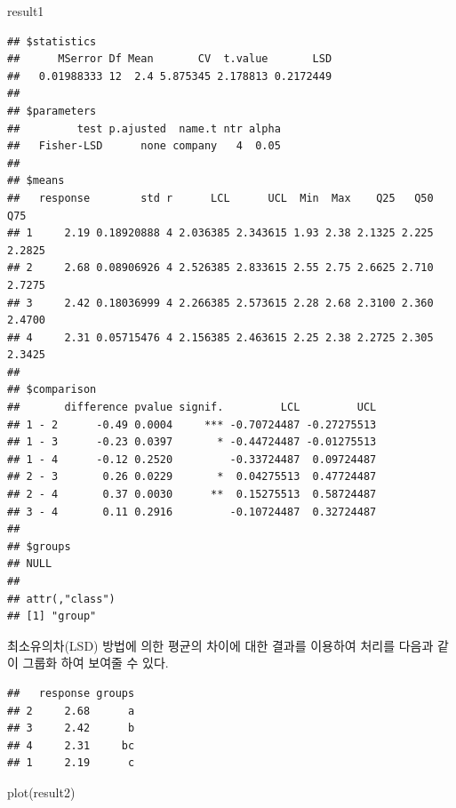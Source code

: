 \documentclass[
]{book}
\newenvironment{Shaded}{\begin{snugshade}}{\end{snugshade}}
\newcommand{\AttributeTok}[1]{\textcolor[rgb]{0.77,0.63,0.00}{#1}}
\newcommand{\ConstantTok}[1]{\textcolor[rgb]{0.00,0.00,0.00}{#1}}
\newcommand{\FunctionTok}[1]{\textcolor[rgb]{0.00,0.00,0.00}{#1}}
\newcommand{\NormalTok}[1]{#1}
\newcommand{\OtherTok}[1]{\textcolor[rgb]{0.56,0.35,0.01}{#1}}
\newcommand{\SpecialCharTok}[1]{\textcolor[rgb]{0.00,0.00,0.00}{#1}}
\newcommand{\StringTok}[1]{\textcolor[rgb]{0.31,0.60,0.02}{#1}}
\begin{document}
\begin{Shaded}
\begin{Highlighting}[]
\NormalTok{result1}
\end{Highlighting}
\end{Shaded}

\begin{verbatim}
## $statistics
##      MSerror Df Mean       CV  t.value       LSD
##   0.01988333 12  2.4 5.875345 2.178813 0.2172449
## 
## $parameters
##         test p.ajusted  name.t ntr alpha
##   Fisher-LSD      none company   4  0.05
## 
## $means
##   response        std r      LCL      UCL  Min  Max    Q25   Q50    Q75
## 1     2.19 0.18920888 4 2.036385 2.343615 1.93 2.38 2.1325 2.225 2.2825
## 2     2.68 0.08906926 4 2.526385 2.833615 2.55 2.75 2.6625 2.710 2.7275
## 3     2.42 0.18036999 4 2.266385 2.573615 2.28 2.68 2.3100 2.360 2.4700
## 4     2.31 0.05715476 4 2.156385 2.463615 2.25 2.38 2.2725 2.305 2.3425
## 
## $comparison
##       difference pvalue signif.         LCL         UCL
## 1 - 2      -0.49 0.0004     *** -0.70724487 -0.27275513
## 1 - 3      -0.23 0.0397       * -0.44724487 -0.01275513
## 1 - 4      -0.12 0.2520         -0.33724487  0.09724487
## 2 - 3       0.26 0.0229       *  0.04275513  0.47724487
## 2 - 4       0.37 0.0030      **  0.15275513  0.58724487
## 3 - 4       0.11 0.2916         -0.10724487  0.32724487
## 
## $groups
## NULL
## 
## attr(,"class")
## [1] "group"
\end{verbatim}

최소유의차(LSD) 방법에 의한 평균의 차이에 대한 결과를 이용하여 처리를 다음과 같이 그룹화 하여 보여줄 수 있다.

\begin{Shaded}
\end{Shaded}

\begin{verbatim}
##   response groups
## 2     2.68      a
## 3     2.42      b
## 4     2.31     bc
## 1     2.19      c
\end{verbatim}

\begin{Shaded}
\begin{Highlighting}[]
\FunctionTok{plot}\NormalTok{(result2)}
\end{Highlighting}
\end{Shaded}
\end{document}
